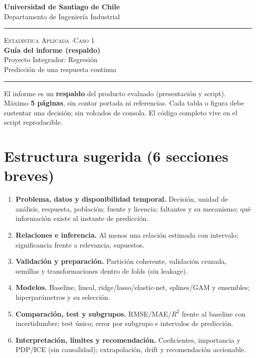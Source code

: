 \documentclass[11pt,letterpaper]{article}
\newcommand{\hrulethin}{\noindent\rule{\textwidth}{0.6pt}}
\begin{document}
\pagestyle{plain}
\begin{center}
    \textbf{\large Universidad de Santiago de Chile}\\[0.1cm]
    Departamento de Ingeniería Industrial
\end{center}
\vspace{0.15cm}\hrulethin\vspace{0.35cm}
\begin{center}
    {\scshape Estadística Aplicada \quad$\cdot$\quad Caso 1}\\[0.35cm]
    {\LARGE \textbf{Guía del informe (respaldo)}}\\[0.15cm]
    {\large Proyecto Integrador: Regresión}\\[0.2cm]
    Predicción de una respuesta continua
\end{center}
\vspace{0.2cm}\hrulethin\vspace{0.4cm}
El informe es un \textbf{respaldo} del producto evaluado (presentación y script). Máximo \textbf{5 páginas}, sin contar portada ni referencias. Cada tabla o figura debe sustentar una decisión; sin volcados de consola. El código completo vive en el script reproducible.

\section*{Estructura sugerida (6 secciones breves)}
\begin{enumerate}
\item \textbf{Problema, datos y disponibilidad temporal.} Decisión, unidad de análisis, respuesta, población; fuente y licencia; faltantes y su mecanismo; qué información existe al instante de predicción.
\item \textbf{Relaciones e inferencia.} Al menos una relación estimada con intervalo; significancia frente a relevancia; supuestos.
\item \textbf{Validación y preparación.} Partición coherente, validación cruzada, semillas y transformaciones dentro de folds (sin leakage).
\item \textbf{Modelos.} Baseline, lineal, ridge/lasso/elastic-net, splines/GAM y ensembles; hiperparámetros y su selección.
\item \textbf{Comparación, test y subgrupos.} RMSE/MAE/$R^2$ frente al baseline con incertidumbre; test único; error por subgrupo e intervalos de predicción.
\item \textbf{Interpretación, límites y recomendación.} Coeficientes, importancia y PDP/ICE (sin causalidad); extrapolación, drift y recomendación accionable.
\end{enumerate}
\end{document}
